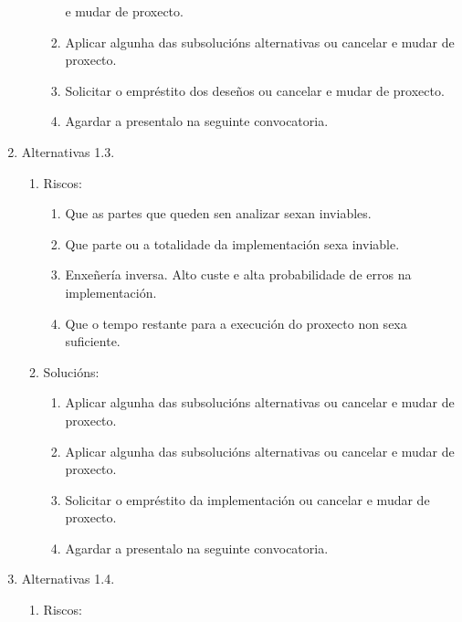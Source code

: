 \begin{enumerate}
\begin{enumerate}
\begin{enumerate}
                      e mudar de proxecto.
                \item Aplicar algunha das subsolucións alternativas ou cancelar
                      e mudar de proxecto.
                \item Solicitar o empréstito dos deseños ou cancelar e mudar de
                      proxecto.
                \item Agardar a presentalo na seguinte convocatoria.
               \end{enumerate}
        \end{enumerate}
  \item Alternativas 1.3.
        \begin{enumerate}
         \item Riscos:
               \begin{enumerate}
                \item Que as partes que queden sen analizar sexan inviables.
                \item Que parte ou a totalidade da implementación sexa
                      inviable.
                \item Enxeñería inversa. Alto custe e alta probabilidade de
                      erros na implementación.
                \item Que o tempo restante para a execución do proxecto non
                      sexa suficiente.
               \end{enumerate}
         \item Solucións:
               \begin{enumerate}
                \item Aplicar algunha das subsolucións alternativas ou cancelar
                      e mudar de proxecto.
                \item Aplicar algunha das subsolucións alternativas ou cancelar
                      e mudar de proxecto.
                \item Solicitar o empréstito da implementación ou cancelar e
                      mudar de proxecto.
                \item Agardar a presentalo na seguinte convocatoria.
               \end{enumerate}
        \end{enumerate}
  \item Alternativas 1.4.
        \begin{enumerate}
         \item Riscos:
               \begin{enumerate}

\end{enumerate}
\end{enumerate}
\end{enumerate}
